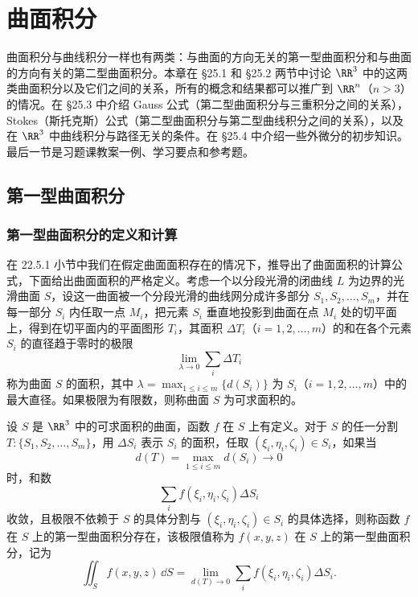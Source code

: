 \chapter{曲面积分}

曲面积分与曲线积分一样也有两类：与曲面的方向无关的第一型曲面积分和与曲面的方向有关的第二型曲面积分。本章在 §25.1 和 §25.2 两节中讨论 $\RR^3$ 中的这两类曲面积分以及它们之间的关系，所有的概念和结果都可以推广到 $\RR^n$（$n>3$）的情况。在 §25.3 中介绍 Gauss 公式（第二型曲面积分与三重积分之间的关系），Stokes（斯托克斯）公式（第二型曲面积分与第二型曲线积分之间的关系），以及在 $\RR^3$ 中曲线积分与路径无关的条件。在 §25.4 中介绍一些外微分的初步知识。最后一节是习题课教案一例、学习要点和参考题。

\section{第一型曲面积分}

\subsection{第一型曲面积分的定义和计算}

在 22.5.1 小节中我们在假定曲面面积存在的情况下，推导出了曲面面积的计算公式，下面给出曲面面积的严格定义。考虑一个以分段光滑的闭曲线 $L$ 为边界的光滑曲面 $S$，设这一曲面被一个分段光滑的曲线网分成许多部分 $S_1,S_2,\ldots,S_m$，并在每一部分 $S_i$ 内任取一点 $M_i$，把元素 $S_i$ 垂直地投影到曲面在点 $M_i$ 处的切平面上，得到在切平面内的平面图形 $T_i$，其面积 $\Delta T_i$（$i=1,2,\ldots,m$）的和在各个元素 $S_i$ 的直径趋于零时的极限
\[
  \lim_{\lambda\to0}\sum_i \Delta T_i
\]
称为曲面 $S$ 的面积，其中 $\lambda=\max_{1\le i\le m}\{d(S_i)\}$ 为 $S_i$（$i=1,2,\ldots,m$）中的最大直径。如果极限为有限数，则称曲面 $S$ 为可求面积的。

设 $S$ 是 $\RR^3$ 中的可求面积的曲面，函数 $f$ 在 $S$ 上有定义。对于 $S$ 的任一分割 $T:\{S_1,S_2,\ldots,S_m\}$，用 $\Delta S_i$ 表示 $S_i$ 的面积，任取 $(\xi_i,\eta_i,\zeta_i)\in S_i$，如果当
\[
  d(T)=\max_{1\le i\le m}d(S_i)\to0
\]
时，和数
\[
  \sum_i f(\xi_i,\eta_i,\zeta_i)\Delta S_i
\]
收敛，且极限不依赖于 $S$ 的具体分割与 $(\xi_i,\eta_i,\zeta_i)\in S_i$ 的具体选择，则称函数 $f$ 在 $S$ 上的第一型曲面积分存在，该极限值称为 $f(x,y,z)$ 在 $S$ 上的第一型曲面积分，记为
\[
  \iint_S f(x,y,z)\,\dd S
  =\lim_{d(T)\to0}\sum_i f(\xi_i,\eta_i,\zeta_i)\Delta S_i.
\]

